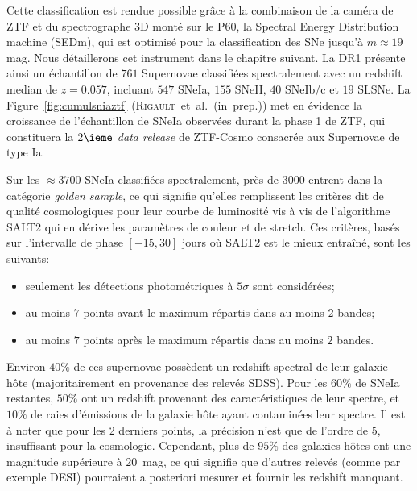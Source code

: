 \documentclass[../main/main.tex]{subfiles}
\begin{document}
Cette classification est rendue possible grâce à la combinaison de la
caméra de ZTF et du spectrographe 3D monté sur le P60, la Spectral
Energy Distribution machine (SEDm), qui est optimisé pour la
classification des SNe jusqu'à $m\approx19$ mag. Nous détaillerons cet instrument
dans le chapitre suivant. La DR1
présente ainsi un échantillon de $761$ Supernovae classifiées
spectralement avec un redshift median de $z=0.057$, incluant $547$ SNeIa, $155$ SNeII, $40$ SNeIb/c et $19$ SLSNe.
La Figure~\ref{fig:cumulsniaztf} (\mbox{\textsc{Rigault} et al. (in prep.)}) met en évidence la croissance de
l'échantillon de SNeIa observées durant la phase 1 de ZTF, qui
constituera la $2\ieme$ \textit{data release} de ZTF-Cosmo consacrée aux Supernovae de
type Ia.

Sur les $\approx3700$ SNeIa classifiées spectralement, près de
$3000$ entrent dans la catégorie \textit{golden sample}, ce qui
signifie qu'elles remplissent les critères dit de qualité cosmologiques
pour leur courbe de luminosité vis à vis de l'algorithme SALT2 qui en
dérive les paramètres de couleur et de stretch. Ces
critères, basés sur l'intervalle de phase $[-15,30]$ jours où SALT2 est
le mieux entraîné, sont les suivants:

\begin{itemize}[label=$\diamondsuit$]
  \itemsep0em 
   \item seulement les détections photométriques à $5\sigma$ sont
     considérées;
   \item au moins $7$ points avant le maximum répartis dans au moins $2$ bandes;
   \item au moins $7$ points après le maximum répartis dans au moins $2$ bandes.
\end{itemize}

Environ $40\%$ de ces supernovae possèdent un redshift spectral de leur
galaxie hôte (majoritairement en provenance des relevés SDSS). Pour les
$60\%$ de SNeIa restantes, $50\%$
ont un redshift provenant des
caractéristiques de leur spectre, et $10\%$ de
raies d'émissions de la galaxie hôte ayant contaminées leur spectre. Il est à noter que pour les 2 derniers points, la précision n'est
que de l'ordre de $5$\textperthousand, insuffisant pour la cosmologie.
Cependant, plus de $95\%$ des galaxies hôtes ont une magnitude supérieure
à $20$~mag, ce qui signifie que d'autres relevés (comme par exemple
DESI) pourraient a posteriori mesurer et fournir les redshift manquant.
\end{document}
